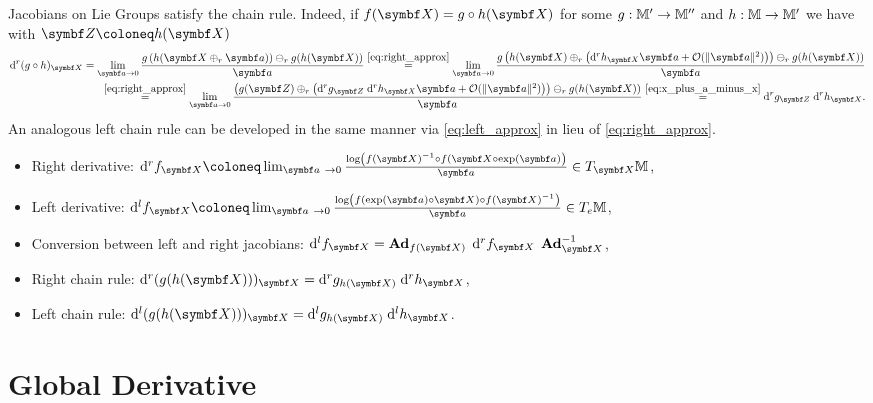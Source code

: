 Jacobians on Lie Groups satisfy the chain rule. Indeed, if $f(\X) = g \circ h (\X)$ for some $g : \mathbb{M}' \rightarrow \mathbb{M}''$ and $h : \mathbb{M} \rightarrow \mathbb{M}'$ we have with $\Z \coloneq h(\X)$
\begin{equation}
  \label{eq:chain_rule}
  \begin{aligned}
    \mathrm{d}^r (g \circ h)_\X = \lim_{\a \rightarrow 0} \frac{g \left( h( \X \oplus_r \a ) \right) \ominus_r g(h(\X))}{\a}  \overset{\eqref{eq:right_approx}} = \lim_{\a \rightarrow 0} \frac{g \left( h( \X ) \oplus_r \left( \mathrm{d}^r h_\X \a + \mathcal O(\|\a\|^2) \right)  \right) \ominus_r g(h(\X))}{\a} \\
    \overset{\eqref{eq:right_approx}} = \lim_{\a \rightarrow 0} \frac{ \left( g (\Z) \oplus_r \left( \mathrm{d}^r g_\Z \;  \mathrm{d}^r h_\X \a + \mathcal O(\| \a \|^2) \right) \right) \ominus_r g(h(\X))}{\a} \overset{\eqref{eq:x_plus_a_minus_x}}= \mathrm{d}^r g_\Z \;  \mathrm{d}^r h_\X.
  \end{aligned}
\end{equation}
An analogous left chain rule can be developed in the same manner via \eqref{eq:left_approx} in lieu of \eqref{eq:right_approx}.

\begin{properties}[title=Important formulas for Lie group derivatives]
  \begin{itemize}
    \item Right derivative: $\mathrm{d}^r f_\X \coloneq \lim_{\a\ \rightarrow 0} \frac{\log \left( f(\X)^{-1} \circ  f(\X \circ \exp(\a) \right)}{\a} \in T_\X \M$,
    \item Left derivative: $\mathrm{d}^l f_\X \coloneq \lim_{\a\ \rightarrow 0} \frac{\log \left( f(\exp(\a) \circ \X) \circ  f(\X)^{-1} \right)}{\a} \in T_\id \M$,
    \item Conversion between left and right jacobians: $\mathrm{d}^l f_\X = \bAd_{f(\X)} \; \mathrm{d}^r f_\X \; \bAd_{\X}^{-1}$,
    \item Right chain rule: $\mathrm{d}^r (g (h(\X)))_\X =  \mathrm{d}^r g_{h(\X)} \;  \mathrm{d}^r h_\X$,
    \item Left chain rule: $\mathrm{d}^l (g (h(\X)))_\X =  \mathrm{d}^l g_{h(\X)} \;  \mathrm{d}^l h_\X$.
  \end{itemize}
\end{properties}

\section{Global Derivative}

